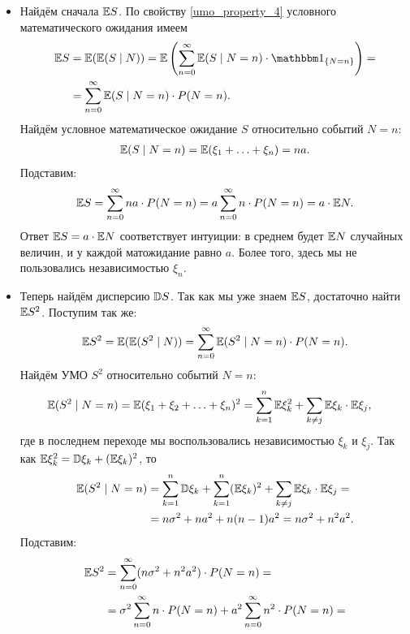 \documentclass[../main.tex]{subfiles}
\begin{document}
\begin{exmpl}
 \begin{itemize}
  \item Найдём сначала $ \mathbb E S $. По свойству \ref{umo_property_4} условного математического ожидания имеем 
   \begin{align*}
    \E S &= \E(\E(S \mid N)) = \E \left( \sum_{n=0}^{\infty} \E(S \mid N = n) \cdot \Ind_{\left\{ N = n \right\}} \right) = \\
    &= \sum_{n=0}^{\infty} \E(S \mid N = n) \cdot P(N = n).
   \end{align*} Найдём условное математическое ожидание $ S $ относительно событий $ N = n $:
   \begin{align*}
    \mathbb E(S \mid N = n) = \mathbb E(\xi_1 + \ldots + \xi_n) = na.
   \end{align*} Подставим:
   \begin{align*}
    \mathbb E S = \sum_{n=0}^{\infty}na \cdot P(N = n) = a \sum_{n=0}^{\infty} n \cdot P(N = n) = a \cdot \mathbb E N.
   \end{align*} Ответ $ \mathbb E S = a\cdot \mathbb E N$ соответствует интуиции: в среднем будет $ \mathbb E N $ случайных величин, и у каждой матожидание равно $ a $. Более того, здесь мы не пользовались независимостью $ \xi_n $.
  \item Теперь найдём дисперсию $ \mathbb D S $. Так как мы уже знаем $ \mathbb E S $, достаточно найти $ \mathbb E S^{2} $. Поступим так же:
   \begin{align*}
    \mathbb E S^{2} = \mathbb E(\mathbb E(S^{2}\mid N)) = \sum_{n=0}^{\infty} \mathbb E(S^{2} \mid N = n) \cdot P(N = n).
   \end{align*} Найдём УМО $ S^{2} $ относительно событий $ N = n $:
   \begin{align*}
    \mathbb E(S^{2} \mid N = n) &= \mathbb E(\xi_1 + \xi_2 + \ldots + \xi_n)^{2} = \sum_{k=1}^{n} \mathbb E \xi_k^{2} + \sum_{k \neq j} \mathbb E\xi_k \cdot \mathbb E\xi_j,
   \end{align*} где в последнем переходе мы воспользовались независимостью $ \xi_k $ и $ \xi_j $. Так как $ \mathbb E\xi_k^{2} = \mathbb D\xi_k + (\mathbb E\xi_k)^{2} $, то
   \begin{align*}
    \mathbb E (S^{2} \mid N = n) &= \sum_{k=1}^{n} \mathbb D\xi_k + \sum_{k=1}^{n} (\mathbb E\xi_k)^{2} + \sum_{k \neq j} \mathbb E\xi_k \cdot \mathbb E\xi_j = \\
    &= n\sigma^{2} + na^{2} + n(n-1)a^{2} = n\sigma^{2} + n^{2}a^{2}.
   \end{align*} Подставим:
   \begin{align*}
    \E S^{2} &= \sum_{n=0}^{\infty}(n\sigma^{2} + n^{2}a^{2})\cdot P(N=n) = \\
    &= \sigma^{2} \sum_{n=0}^{\infty} n \cdot P(N=n) + a^{2} \sum_{n=0}^{\infty} n^{2}\cdot P(N=n) = \\

\end{align*}
\end{itemize}
\end{exmpl}
\end{document}

